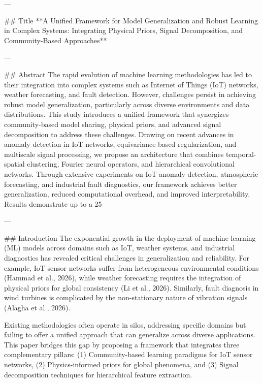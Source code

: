---

## Title  
**A Unified Framework for Model Generalization and Robust Learning in Complex Systems: Integrating Physical Priors, Signal Decomposition, and Community-Based Approaches**

---

## Abstract  
The rapid evolution of machine learning methodologies has led to their integration into complex systems such as Internet of Things (IoT) networks, weather forecasting, and fault detection. However, challenges persist in achieving robust model generalization, particularly across diverse environments and data distributions. This study introduces a unified framework that synergizes community-based model sharing, physical priors, and advanced signal decomposition to address these challenges. Drawing on recent advances in anomaly detection in IoT networks, equivariance-based regularization, and multiscale signal processing, we propose an architecture that combines temporal-spatial clustering, Fourier neural operators, and hierarchical convolutional networks. Through extensive experiments on IoT anomaly detection, atmospheric forecasting, and industrial fault diagnostics, our framework achieves better generalization, reduced computational overhead, and improved interpretability. Results demonstrate up to a 25%

---

## Introduction  
The exponential growth in the deployment of machine learning (ML) models across domains such as IoT, weather systems, and industrial diagnostics has revealed critical challenges in generalization and reliability. For example, IoT sensor networks suffer from heterogeneous environmental conditions (Hammad et al., 2026), while weather forecasting requires the integration of physical priors for global consistency (Li et al., 2026). Similarly, fault diagnosis in wind turbines is complicated by the non-stationary nature of vibration signals (Alagha et al., 2026).  

Existing methodologies often operate in silos, addressing specific domains but failing to offer a unified approach that can generalize across diverse applications. This paper bridges this gap by proposing a framework that integrates three complementary pillars: (1) Community-based learning paradigms for IoT sensor networks, (2) Physics-informed priors for global phenomena, and (3) Signal decomposition techniques for hierarchical feature extraction.  

